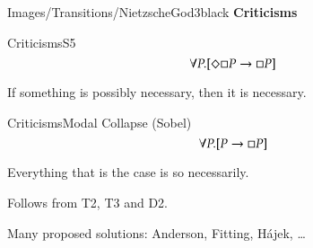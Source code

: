 \begin{transitionframe}{Images/Transitions/NietzscheGod3}{black}
\textbf{Criticisms}
\end{transitionframe}

\begin{frame}{Criticisms}{S5} \centering
$$
\forall P.[ \Diamond \Box P \rightarrow \Box P ] 
$$

\medskip

If something is possibly necessary, then it is necessary.


\bigskip






















\end{frame}


\begin{frame}{Criticisms}{Modal Collapse (Sobel)} \centering
$$
\forall P.[ P \rightarrow \Box P ] 
$$

\medskip

Everything that is the case is so necessarily.


\bigskip

Follows from T2, T3 and D2.




\bigskip

Many proposed solutions: Anderson, Fitting, H\'ajek, \ldots
 
\end{frame}


